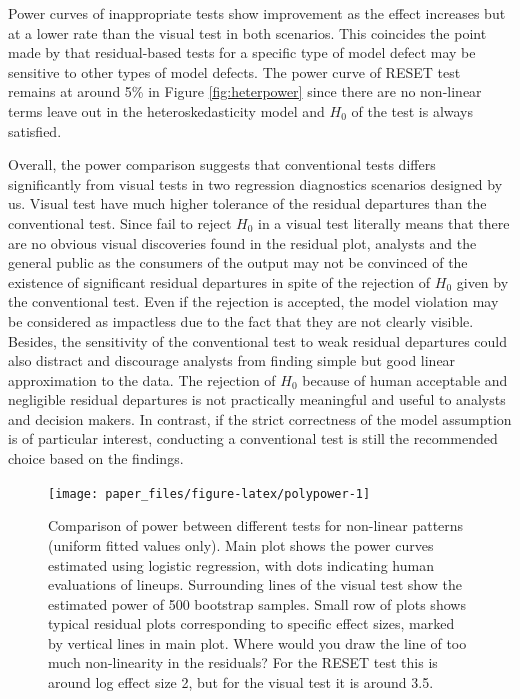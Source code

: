 \documentclass[]{interact}
\theoremstyle{plain}%
\theoremstyle{definition}
\theoremstyle{remark}
\begin{document}
Power curves of inappropriate tests show improvement as the effect
increases but at a lower rate than the visual test in both scenarios.
This coincides the point made by \citet{cook1982residuals} that
residual-based tests for a specific type of model defect may be
sensitive to other types of model defects. The power curve of RESET test
remains at around 5\% in Figure \ref{fig:heterpower} since there are no
non-linear terms leave out in the heteroskedasticity model and \(H_0\)
of the test is always satisfied.

Overall, the power comparison suggests that conventional tests differs
significantly from visual tests in two regression diagnostics scenarios
designed by us. Visual test have much higher tolerance of the residual
departures than the conventional test. Since fail to reject \(H_0\) in a
visual test literally means that there are no obvious visual discoveries
found in the residual plot, analysts and the general public as the
consumers of the output may not be convinced of the existence of
significant residual departures in spite of the rejection of \(H_0\)
given by the conventional test. Even if the rejection is accepted, the
model violation may be considered as impactless due to the fact that
they are not clearly visible. Besides, the sensitivity of the
conventional test to weak residual departures could also distract and
discourage analysts from finding simple but good linear approximation to
the data. The rejection of \(H_0\) because of human acceptable and
negligible residual departures is not practically meaningful and useful
to analysts and decision makers. In contrast, if the strict correctness
of the model assumption is of particular interest, conducting a
conventional test is still the recommended choice based on the findings.

\begin{figure}

{\centering \texttt{[image: paper\_files/figure-latex/polypower-1]} 

}

\caption{Comparison of power between different tests for non-linear patterns (uniform fitted values only). Main plot shows the power curves estimated using logistic regression, with dots indicating human evaluations of lineups. Surrounding lines of the visual test show the estimated power of 500 bootstrap samples. Small row of plots shows typical residual plots corresponding to specific effect sizes, marked by vertical lines in main plot. Where would you draw the line of too much non-linearity in the residuals? For the RESET test this is around log effect size 2, but for the visual test it is around 3.5.}\label{fig:polypower}
\end{figure}
\end{document}
